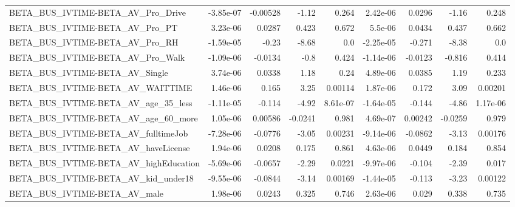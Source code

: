 \begin{tabular}{lrrrrrrrr}
BETA\_BUS\_IVTIME-BETA\_AV\_Pro\_Drive                  &   -3.85e-07 &     -0.00528 &     -1.12 &    0.264 &   2.42e-06 &      0.0296 &        -1.16 &         0.248 \\
BETA\_BUS\_IVTIME-BETA\_AV\_Pro\_PT                     &    3.23e-06 &       0.0287 &     0.423 &    0.672 &    5.5e-06 &      0.0434 &        0.437 &         0.662 \\
BETA\_BUS\_IVTIME-BETA\_AV\_Pro\_RH                     &   -1.59e-05 &        -0.23 &     -8.68 &      0.0 &  -2.25e-05 &      -0.271 &        -8.38 &           0.0 \\
BETA\_BUS\_IVTIME-BETA\_AV\_Pro\_Walk                   &   -1.09e-06 &      -0.0134 &      -0.8 &    0.424 &  -1.14e-06 &     -0.0123 &       -0.816 &         0.414 \\
BETA\_BUS\_IVTIME-BETA\_AV\_Single                     &    3.74e-06 &       0.0338 &      1.18 &     0.24 &   4.89e-06 &      0.0385 &         1.19 &         0.233 \\
BETA\_BUS\_IVTIME-BETA\_AV\_WAITTIME                   &    1.46e-06 &        0.165 &      3.25 &  0.00114 &   1.87e-06 &       0.172 &         3.09 &       0.00201 \\
BETA\_BUS\_IVTIME-BETA\_AV\_age\_35\_less                &   -1.11e-05 &       -0.114 &     -4.92 & 8.61e-07 &  -1.64e-05 &      -0.144 &        -4.86 &      1.17e-06 \\
BETA\_BUS\_IVTIME-BETA\_AV\_age\_60\_more                &    1.05e-06 &      0.00586 &   -0.0241 &    0.981 &   4.69e-07 &     0.00242 &      -0.0259 &         0.979 \\
BETA\_BUS\_IVTIME-BETA\_AV\_fulltimeJob                &   -7.28e-06 &      -0.0776 &     -3.05 &  0.00231 &  -9.14e-06 &     -0.0862 &        -3.13 &       0.00176 \\
BETA\_BUS\_IVTIME-BETA\_AV\_haveLicense                &    1.94e-06 &       0.0208 &     0.175 &    0.861 &   4.63e-06 &      0.0449 &        0.184 &         0.854 \\
BETA\_BUS\_IVTIME-BETA\_AV\_highEducation              &   -5.69e-06 &      -0.0657 &     -2.29 &   0.0221 &  -9.97e-06 &      -0.104 &        -2.39 &         0.017 \\
BETA\_BUS\_IVTIME-BETA\_AV\_kid\_under18                &   -9.55e-06 &      -0.0844 &     -3.14 &  0.00169 &  -1.44e-05 &      -0.113 &        -3.23 &       0.00122 \\
BETA\_BUS\_IVTIME-BETA\_AV\_male                       &    1.98e-06 &       0.0243 &     0.325 &    0.746 &   2.63e-06 &       0.029 &        0.338 &         0.735 \\

\end{tabular}
